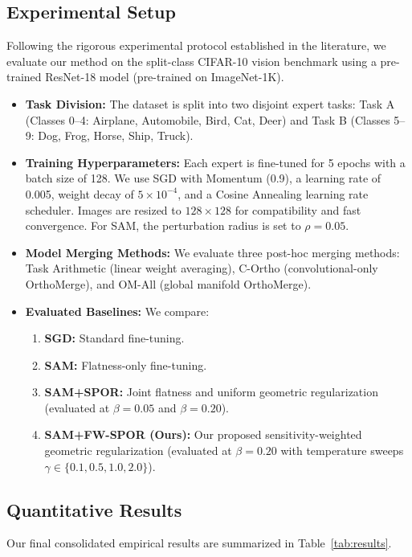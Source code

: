 \documentclass{article}
\theoremstyle{plain}
\theoremstyle{definition}
\theoremstyle{remark}
\begin{document}
\subsection{Experimental Setup}
Following the rigorous experimental protocol established in the literature, we evaluate our method on the split-class CIFAR-10 vision benchmark using a pre-trained ResNet-18 model (pre-trained on ImageNet-1K). 
\begin{itemize}
    \item \textbf{Task Division:} The dataset is split into two disjoint expert tasks: Task A (Classes 0--4: Airplane, Automobile, Bird, Cat, Deer) and Task B (Classes 5--9: Dog, Frog, Horse, Ship, Truck).
    \item \textbf{Training Hyperparameters:} Each expert is fine-tuned for 5 epochs with a batch size of 128. We use SGD with Momentum (0.9), a learning rate of 0.005, weight decay of $5 \times 10^{-4}$, and a Cosine Annealing learning rate scheduler. Images are resized to $128 \times 128$ for compatibility and fast convergence. For SAM, the perturbation radius is set to $\rho = 0.05$.
    \item \textbf{Model Merging Methods:} We evaluate three post-hoc merging methods: Task Arithmetic (linear weight averaging), C-Ortho (convolutional-only OrthoMerge), and OM-All (global manifold OrthoMerge).
    \item \textbf{Evaluated Baselines:} We compare:
    \begin{enumerate}
        \item \textbf{SGD:} Standard fine-tuning.
        \item \textbf{SAM:} Flatness-only fine-tuning.
        \item \textbf{SAM+SPOR:} Joint flatness and uniform geometric regularization (evaluated at $\beta = 0.05$ and $\beta = 0.20$).
        \item \textbf{SAM+FW-SPOR (Ours):} Our proposed sensitivity-weighted geometric regularization (evaluated at $\beta = 0.20$ with temperature sweeps $\gamma \in \{0.1, 0.5, 1.0, 2.0\}$).
    \end{enumerate}
\end{itemize}

\subsection{Quantitative Results}
Our final consolidated empirical results are summarized in Table~\ref{tab:results}.
\end{document}
